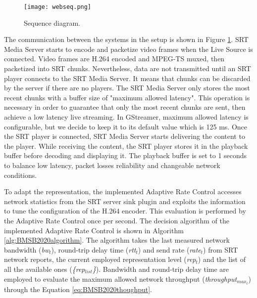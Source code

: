 \begin{figure}[htp]
	\centering 
	\texttt{[image: webseq.png]}
	\caption{Sequence diagram.}
	\label{fig:BMSB2020sequence}
\end{figure}

The communication between the systems in the setup is shown in Figure \ref{fig:BMSB2020sequence}. SRT Media Server starts to encode and packetize video frames when the Live Source is connected. Video frames are H.264 encoded and MPEG-TS muxed, then packetized into SRT chunks.
Nevertheless, data are not transmitted until an SRT player connects to the SRT Media Server. It means that chunks can be discarded by the server if there are no players. The SRT Media Server only stores the most recent chunks with a buffer size of "maximum allowed latency". This operation is necessary in order to guarantee that only the most recent chunks are sent, then achieve a low latency live streaming. In GStreamer, maximum allowed latency is configurable, but we decide to keep it to its default value which is 125 ms. Once the SRT player is connected, SRT Media Server starts delivering the content to the player. While receiving the content, the SRT player stores it in the playback buffer before decoding and displaying it. The playback buffer is set to 1 seconds to balance low latency, packet losses reliability and changeable network conditions.

To adapt the representation, the implemented Adaptive Rate Control accesses network statistics from the SRT server sink plugin and exploits the information to tune the configuration of the H.264 encoder. This evaluation is performed by the Adaptive Rate Control once per second. The decision algorithm of the implemented Adaptive Rate Control is shown in Algorithm \ref{alg:BMSB2020algorithm}. The algorithm takes the last measured network bandwidth (\textit{bw$_t$}), round-trip delay time (\textit{rtt$_t$}) and send rate (\textit{rate$_t$}) from SRT network reports, the current employed representation level (\textit{rep$_t$}) and the list of all the available ones (\textit{\{rep$_{list}$\}}). Bandwidth and round-trip delay time are employed to evaluate the maximum allowed network throughput (\textit{throughput$_{max_t}$}) through the Equation \ref{eq:BMSB2020thoughput}.

